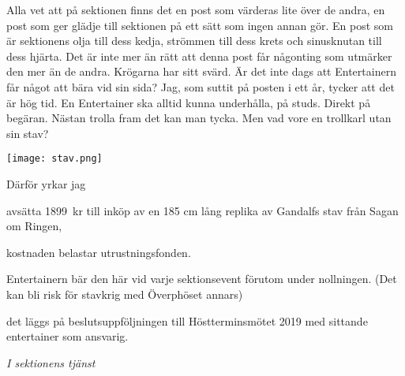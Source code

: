 \documentclass[../_main/handlingar.tex]{subfiles}
\begin{document}

Alla vet att på sektionen finns det en post som värderas lite över de andra, en post som ger glädje till
sektionen på ett sätt som ingen annan gör. En post som är sektionens olja till dess kedja, strömmen
till dess krets och sinusknutan till dess hjärta. Det är inte mer än rätt att denna post får någonting
som utmärker den mer än de andra. Krögarna har sitt svärd. Är det inte dags att Entertainern får
något att bära vid sin sida? Jag, som suttit på posten i ett år, tycker att det är hög tid. En Entertainer
ska alltid kunna underhålla, på studs. Direkt på begäran. Nästan trolla fram det kan man tycka. Men
vad vore en trollkarl utan sin stav? 


\begin{center}
    \texttt{[image: stav.png]}
\end{center}

Därför yrkar jag
\begin{attsatser}
    \att avsätta \SI{1899}{kr} till inköp av en 185 cm lång replika av Gandalfs stav från Sagan om Ringen,
    
    \att kostnaden belastar utrustningsfonden.

    \att Entertainern bär den här vid varje sektionsevent förutom under nollningen. (Det kan bli risk för
    stavkrig med Överphöset annars)

    \att det läggs på beslutsuppföljningen till Höstterminsmötet 2019 med sittande entertainer som ansvarig. 
\end{attsatser}

\begin{signatures}{1}
    \emph{I sektionens tjänst}
    \signature{Adam Belfrage}{}
    
\end{signatures}
\end{document}
